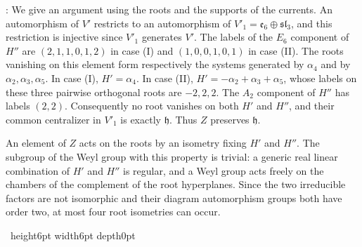 \documentclass[leqno]{article}
\newcommand{\qed}{\hfill \vrule height6pt  width6pt depth0pt}
\newenvironment{proof}[1][]{\noindent {\it Proof #1} : }{\hbox{~}\qed
\smallskip
}
\numberwithin{equation}{section}
\begin{document}
\begin{proof}
We give an argument using the roots and the supports of the currents. An automorphism of $V'$ restricts to an automorphism of $V'_1 = \mathfrak e_6 \oplus \mathfrak{sl}_3$, and this restriction is injective since $V'_1$ generates $V'$. The labels of the $E_6$ component of $H''$ are $(2,1,1,0,1,2)$ in case (I) and $(1,0,0,1,0,1)$ in case (II). The roots vanishing on this element form respectively the systems generated by $\alpha_4$ and by $\alpha_2,\alpha_3,\alpha_5$. In case (I), $H' = \alpha_4$. In case (II), $H' = -\alpha_2+\alpha_3+\alpha_5$, whose labels on these three pairwise orthogonal roots are $-2,2,2$. The $A_2$ component of $H''$ has labels $(2,2)$. Consequently no root vanishes on both $H'$ and $H''$, and their common centralizer in $V'_1$ is exactly $\mathfrak h$. Thus $Z$ preserves $\mathfrak h$.

An element of $Z$ acts on the roots by an isometry fixing $H'$ and $H''$. The subgroup of the Weyl group with this property is trivial: a generic real linear combination of $H'$ and $H''$ is regular, and a Weyl group acts freely on the chambers of the complement of the root hyperplanes. Since the two irreducible factors are not isomorphic and their diagram automorphism groups both have order two, at most four root isometries can occur.


\end{proof}
\end{document}
